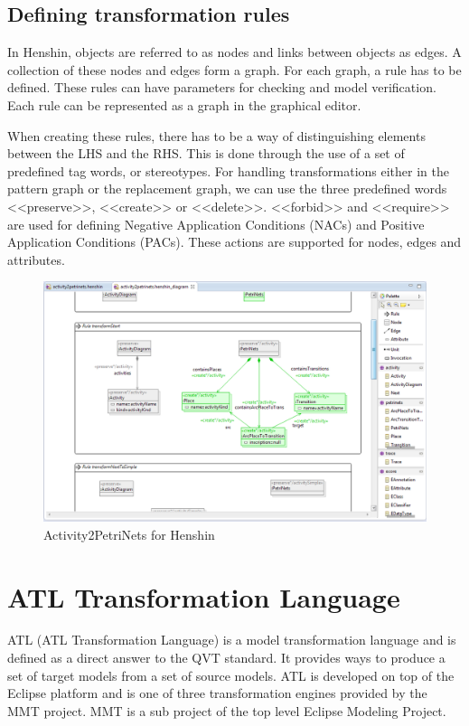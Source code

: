 \subsection{Defining transformation rules}

\noindent In Henshin, objects are referred to as nodes and links between objects
as edges. A collection of these nodes and edges form a graph. For each graph, a
rule has to be defined. These rules can have parameters for checking and model
verification. Each rule can be represented as a graph in the graphical
editor. 

\indent When creating these rules, there has to be a way of
distinguishing elements between the LHS and the RHS. This is done through the
use of a set of predefined tag words, or stereotypes. For handling transformations
either in the pattern graph or the replacement graph, we can use the three
predefined words <<preserve>>, <<create>> or <<delete>>. <<forbid>> and
<<require>> are used for defining Negative Application Conditions (NACs) and
Positive Application Conditions (PACs). These actions are supported for nodes,
edges and attributes. 

\begin{figure}[H]
	\centering
	\includegraphics[scale=0.5]{figures/HenshinScreen.png}
	\caption{Activity2PetriNets for Henshin}
	\label{fig:HenshinScreen}
\end{figure}

\section{ATL Transformation Language}

\noindent ATL\cite{ATL} (ATL Transformation Language) is a model transformation
language and is defined as a direct answer to the QVT\cite{QVT} standard. It
provides ways to produce a set of target models from a set of source models.
ATL is developed on top of the Eclipse platform and is one of three
transformation engines provided by the MMT project\cite{MMT}. MMT is a sub
project of the top level Eclipse Modeling Project\cite{EMP}.

